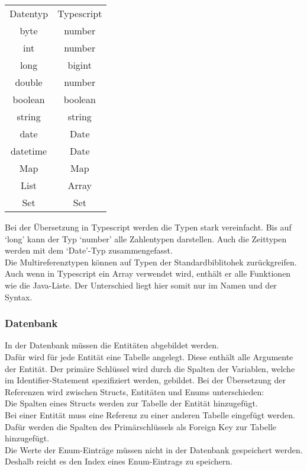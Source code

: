 \documentclass[./einleitung.tex]{subfiles}
\begin{document}
    \begin{center}
        \begin{tabular}{| c || c |}
            \hline
            Datentyp & Typescript \\
            \hhline{|=||=|}
            byte     & number     \\
            \hline
            int      & number     \\
            \hline
            long     & bigint     \\
            \hline
            double   & number     \\
            \hline
            boolean  & boolean    \\
            \hline
            string   & string     \\
            \hline
            date     & Date       \\
            \hline
            datetime & Date       \\
            \hline
            Map & Map\\
            \hline
            List & Array\\
            \hline
            Set & Set\\
            \hline
        \end{tabular}
    \end{center}
    Bei der Übersetzung in Typescript werden die Typen stark vereinfacht.
    Bis auf `long' kann der Typ `number' alle Zahlentypen darstellen.
    Auch die Zeittypen werden mit dem `Date'-Typ zusammengefasst.\\
    Die Multireferenztypen können auf Typen der Standardbiblitohek zurückgreifen.
    Auch wenn in Typescript ein Array verwendet wird, enthält er alle Funktionen wie die Java-Liste.
    Der Unterschied liegt hier somit nur im Namen und der Syntax.

    \subsubsection{Datenbank}\label{subsubsec:db-schema}
    In der Datenbank müssen die Entitäten abgebildet werden.\\
    Dafür wird für jede Entität eine Tabelle angelegt.
    Diese enthält alle Argumente der Entität.
    Der primäre Schlüssel wird durch die Spalten der Variablen, welche im Identifier-Statement spezifiziert werden, gebildet.
    Bei der Übersetzung der Referenzen wird zwischen Structs, Entitäten und Enums unterschieden:\\
    Die Spalten eines Structs werden zur Tabelle der Entität hinzugefügt.\\
    Bei einer Entität muss eine Referenz zu einer anderen Tabelle eingefügt werden.
    Dafür werden die Spalten des Primärschlüssels als Foreign Key zur Tabelle hinzugefügt.\\
    Die Werte der Enum-Einträge müssen nicht in der Datenbank gespeichert werden.
    Deshalb reicht es den Index eines Enum-Eintrags zu speichern.
\end{document}
